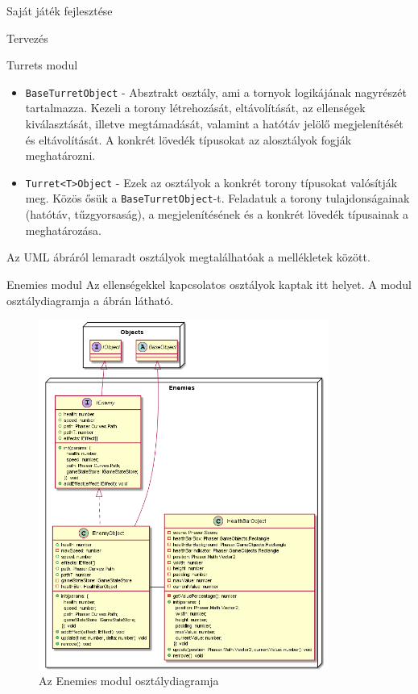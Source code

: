 \begin{MyChapter}{Saját játék fejlesztése}
\begin{MySection}{Tervezés}
\begin{MySubSection}{Turrets modul}
\begin{itemize}
				\item \texttt{BaseTurretObject} - Absztrakt osztály, ami a tornyok logikájának nagyrészét tartalmazza. Kezeli a torony létrehozását, eltávolítását, az ellenségek kiválasztását, illetve megtámadását, valamint a hatótáv jelölő megjelenítését és eltávolítását. A konkrét lövedék típusokat az alosztályok fogják meghatározni.
				
				\item \texttt{Turret<T>Object} - Ezek az osztályok a konkrét torony típusokat valósítják meg. Közös ősük a \texttt{BaseTurretObject}-t. Feladatuk a torony tulajdonságainak (hatótáv, tűzgyorsaság), a megjelenítésének és a konkrét lövedék típusainak a meghatározása.
				
			\end{itemize}
			
			Az UML ábráról lemaradt osztályok megtalálhatóak a mellékletek között.
		\end{MySubSection}

		\begin{MySubSection}{Enemies modul}
			Az ellenségekkel kapcsolatos osztályok kaptak itt helyet.
			A modul osztálydiagramja a  ábrán látható.
				
			\begin{figure}[h]
				\centering
				\includegraphics[width=0.85\textwidth]{kepek/uml/enemies/enemy.png}
				\caption{Az Enemies modul osztálydiagramja}
				\label{fig:uml:enemy}
			\end{figure}
			

\end{MySubSection}
\end{MySection}
\end{MyChapter}
